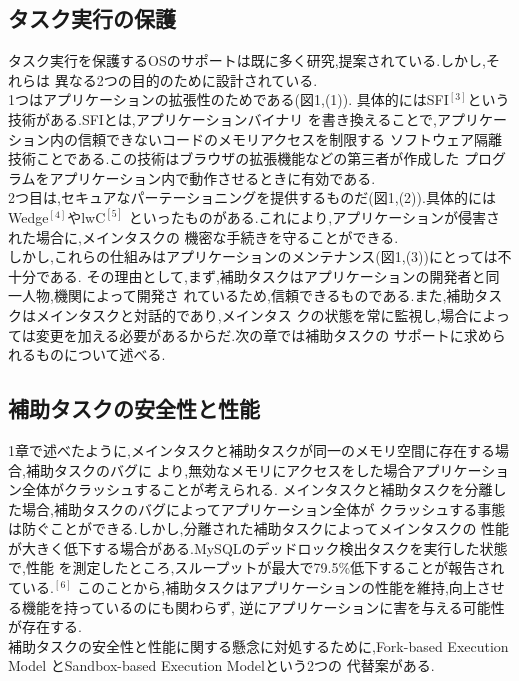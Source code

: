 \documentclass[submit,techreq,noauthor]{eco}	%
\begin{document}
\subsection{タスク実行の保護}
\indent タスク実行を保護するOSのサポートは既に多く研究,提案されている.しかし,それらは
異なる2つの目的のために設計されている.\\
1つはアプリケーションの拡張性のためである(図1,(1)).
具体的にはSFI\begin{math}^{[3]}\end{math}という技術がある.SFIとは,アプリケーションバイナリ
を書き換えることで,アプリケーション内の信頼できないコードのメモリアクセスを制限する
ソフトウェア隔離技術ことである.この技術はブラウザの拡張機能などの第三者が作成した
プログラムをアプリケーション内で動作させるときに有効である.\\
2つ目は,セキュアなパーテーショニングを提供するものだ(図1,(2)).具体的には
Wedge\begin{math}^{[4]}\end{math}やlwC\begin{math}^{[5]}\end{math}
といったものがある.これにより,アプリケーションが侵害された場合に,メインタスクの
機密な手続きを守ることができる.\\
しかし,これらの仕組みはアプリケーションのメンテナンス(図1,(3))にとっては不十分である.
その理由として,まず,補助タスクはアプリケーションの開発者と同一人物,機関によって開発さ
れているため,信頼できるものである.また,補助タスクはメインタスクと対話的であり,メインタス
クの状態を常に監視し,場合によっては変更を加える必要があるからだ.次の章では補助タスクの
サポートに求められるものについて述べる.

\subsection{補助タスクの安全性と性能}
1章で述べたように,メインタスクと補助タスクが同一のメモリ空間に存在する場合,補助タスクのバグに
より,無効なメモリにアクセスをした場合アプリケーション全体がクラッシュすることが考えられる.
メインタスクと補助タスクを分離した場合,補助タスクのバグによってアプリケーション全体が
クラッシュする事態は防ぐことができる.しかし,分離された補助タスクによってメインタスクの
性能が大きく低下する場合がある.MySQLのデッドロック検出タスクを実行した状態で,性能
を測定したところ,スループットが最大で79.5\%低下することが報告されている.\begin{math}^{[6]}\end{math}
このことから,補助タスクはアプリケーションの性能を維持,向上させる機能を持っているのにも関わらず,
逆にアプリケーションに害を与える可能性が存在する.\\
\indent 補助タスクの安全性と性能に関する懸念に対処するために,Fork-based Execution Model とSandbox-based Execution Modelという2つの
代替案がある.
\end{document}
